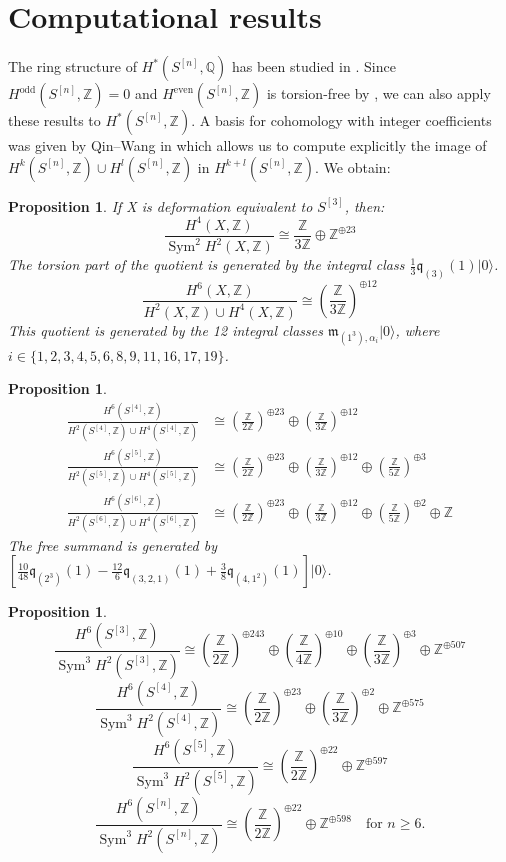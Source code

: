 \documentclass{amsart}
\DeclareMathOperator{\Sym}{Sym}
\newcommand{\hilb}[1]{^{[#1]}}
\newcommand{\vac}{|0\rangle}
\newcommand{\IQ}{\mathbb{Q}}
\newcommand{\IZ}{\mathbb{Z}}
\newcommand{\km}{\mathfrak{m}}
\newcommand{\kq}{\mathfrak{q}}
\theoremstyle{plain}
\newtheorem{proposition}[theorem]{Proposition}
\theoremstyle{definition}
\theoremstyle{remark}
\begin{document}
\section{Computational results}
The ring structure of $H^\ast(S\hilb{n}, \IQ)$ has been studied in \cite{LehnSorger}. 
Since $H^\text{odd}(S\hilb{n},\IZ) = 0$ and $H^\text{even}(S\hilb{n},\IZ)$ is torsion-free by \cite{Markman}, we can also apply these results to  $H^\ast(S\hilb{n}, \IZ)$. A basis for cohomology with integer coefficients was given by Qin--Wang in \cite{QinWang} which allows us to compute explicitly the image of $H^k(S\hilb{n}, \IZ) \cup H^l(S\hilb{n}, \IZ)$ in $H^{k+l}(S\hilb{n}, \IZ)$. 
We obtain:
\begin{proposition}
If X is deformation equivalent to $S\hilb{3}$, then:
$$
\frac{H^4(X,\IZ)}{\Sym^2 H^2(X,\IZ)} \cong \frac{\IZ}{3\IZ} \oplus \IZ^ {\oplus 23} 
$$
The torsion part of the quotient is generated by the integral class $\frac{1}{3}\kq_{(3)}(1)\vac$.
$$
\frac{H^6(X,\IZ)}{H^2(X,\IZ)\cup H^4(X,\IZ)} \cong \left(\frac{\IZ}{3\IZ}\right)^{\oplus 12} 
$$
This quotient is generated by the 12 integral classes $\km_{(1^3),\alpha_i}\vac$, where \\$ i \in \{ 1,2,3,4,5,6,8,9,11,16,17,19 \}$.
\end{proposition}
\begin{proposition}
\begin{align*}
\frac{H^6(S\hilb{4},\IZ)}{H^2(S\hilb{4},\IZ)\cup H^4(S\hilb{4},\IZ)} &\cong \left(\frac{\IZ}{2\IZ}\right)^{\oplus 23} \oplus \left(\frac{\IZ}{3\IZ}\right)^{\oplus 12} \\
\frac{H^6(S\hilb{5},\IZ)}{H^2(S\hilb{5},\IZ)\cup H^4(S\hilb{5},\IZ)} &\cong \left(\frac{\IZ}{2\IZ}\right)^{\oplus 23} \oplus \left(\frac{\IZ}{3\IZ}\right)^{\oplus 12} \oplus \left(\frac{\IZ}{5\IZ}\right)^{\oplus 3} \\
\frac{H^6(S\hilb{6},\IZ)}{H^2(S\hilb{6},\IZ)\cup H^4(S\hilb{6},\IZ)} &\cong \left(\frac{\IZ}{2\IZ}\right)^{\oplus 23} \oplus \left(\frac{\IZ}{3\IZ}\right)^{\oplus 12} \oplus \left(\frac{\IZ}{5\IZ}\right)^{\oplus 2}\oplus \IZ
\end{align*}
The free summand is generated by $\left[\frac{10}{48}\kq_{(2^3)}(1) - \frac{12}{6}\kq_{(3,2,1)}(1) + \frac{3}{8}\kq_{(4,1^2)}(1) \right]\vac $.
\end{proposition}
\begin{proposition}
$$
\frac{H^6(S\hilb{3},\IZ)}{\Sym^3 H^2(S\hilb{3},\IZ)} \cong  \left(\frac{\IZ}{2\IZ}\right)^{\oplus 243}\oplus \left(\frac{\IZ}{4\IZ}\right)^{\oplus 10}\oplus \left(\frac{\IZ}{3\IZ}\right)^{\oplus 3} \oplus \IZ^{\oplus 507}
$$
$$
\frac{H^6(S\hilb{4},\IZ)}{\Sym^3 H^2(S\hilb{4},\IZ)} \cong  \left(\frac{\IZ}{2\IZ}\right)^{\oplus 23}\oplus \left(\frac{\IZ}{3\IZ}\right)^{\oplus 2} \oplus \IZ^{\oplus 575}
$$
$$
\frac{H^6(S\hilb{5},\IZ)}{\Sym^3 H^2(S\hilb{5},\IZ)} \cong  \left(\frac{\IZ}{2\IZ}\right)^{\oplus 22} \oplus \IZ^{\oplus 597}
$$
$$
\frac{H^6(S\hilb{n},\IZ)}{\Sym^3 H^2(S\hilb{n},\IZ)} \cong  \left(\frac{\IZ}{2\IZ}\right)^{\oplus 22} \oplus \IZ^{\oplus 598} \quad \text{for } n\geq 6.
$$
\end{proposition}



\end{document}
